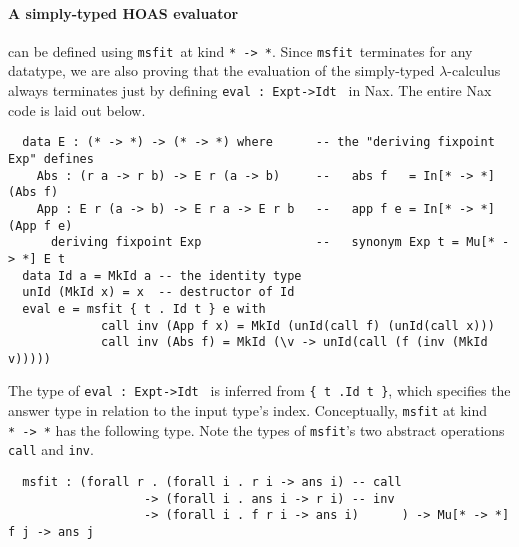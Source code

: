 \documentclass[a4paper]{easychair} %
\newcommand{\msfit}[0]{\texttt{msfit}}
\begin{document}
\paragraph{A simply-typed HOAS evaluator\!\!\!} can be defined
using \msfit\ at kind \texttt{*\,->\,*}.  Since \msfit\ terminates
for any datatype, we are also proving that the evaluation of
the simply-typed $\lambda$-calculus always terminates
just by defining \texttt{eval\,:\,Exp\;t\;->\;Id\;t\,} in Nax.
The entire Nax code is laid out below. \cite{BerSch91}
\vspace*{-1ex}
{\small
\begin{verbatim}
  data E : (* -> *) -> (* -> *) where      -- the "deriving fixpoint Exp" defines
    Abs : (r a -> r b) -> E r (a -> b)     --   abs f   = In[* -> *] (Abs f)
    App : E r (a -> b) -> E r a -> E r b   --   app f e = In[* -> *] (App f e)
      deriving fixpoint Exp                --   synonym Exp t = Mu[* -> *] E t
  data Id a = MkId a -- the identity type
  unId (MkId x) = x  -- destructor of Id
  eval e = msfit { t . Id t } e with
             call inv (App f x) = MkId (unId(call f) (unId(call x)))
             call inv (Abs f) = MkId (\v -> unId(call (f (inv (MkId v)))))
\end{verbatim} }
\vspace*{-.5ex}
\noindent
The type of \texttt{eval\,:\,Exp\;t\;->\;Id\;t\,} is inferred from
\texttt{\{\,t\,.\;Id t\,\}}, which specifies the answer type in relation
to the input type's index.
Conceptually, \texttt{msfit} at kind \texttt{*\,->\,*} has the following type.
Note the types of \texttt{msfit}'s two abstract operations
\texttt{call} and \texttt{inv}.\vspace*{-.5ex}
{\small
\begin{verbatim}
  msfit : (forall r . (forall i . r i -> ans i) -- call
                   -> (forall i . ans i -> r i) -- inv
                   -> (forall i . f r i -> ans i)      ) -> Mu[* -> *] f j -> ans j
\end{verbatim} }
\vspace*{-2.5ex}
\end{document}

